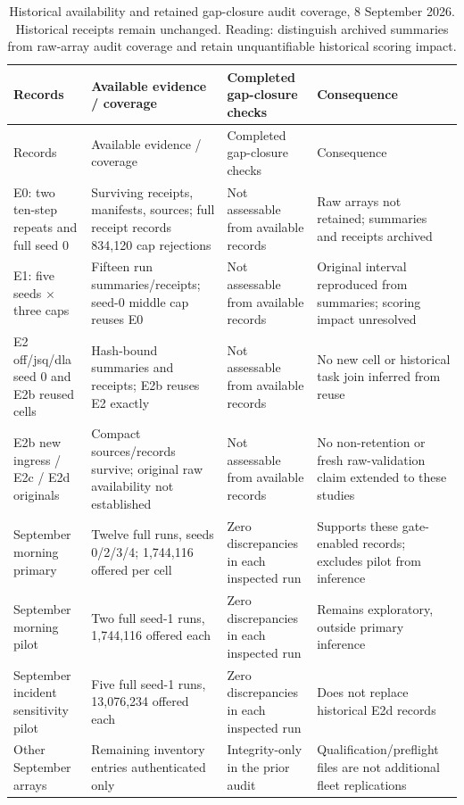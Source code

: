 \documentclass[12pt,a4paper]{article}
\begin{document}
\begingroup
\singlespacing\footnotesize\setlength{\tabcolsep}{3pt}
\renewcommand{\thetable}{B1}
\begin{xltabular}{\textwidth}{@{}YYYY@{}}
\caption[Historical audit coverage]{Historical availability and retained gap-closure audit coverage, 8 September 2026. Historical receipts remain unchanged. Reading: distinguish archived summaries from raw-array audit coverage and retain unquantifiable historical scoring impact.}\label{tab:B1} \\
\toprule
Records & Available evidence / coverage & Completed gap-closure checks & Consequence \\
\midrule\endfirsthead
\toprule
Records & Available evidence / coverage & Completed gap-closure checks & Consequence \\
\midrule\endhead
\bottomrule\endfoot
E0: two ten-step repeats and full seed 0 & Surviving receipts, manifests, sources; full receipt records 834,120 cap rejections & Not assessable from available records & Raw arrays not retained; summaries and receipts archived \\
E1: five seeds \ensuremath{\times} three caps & Fifteen run summaries/receipts; seed-0 middle cap reuses E0 & Not assessable from available records & Original interval reproduced from summaries; scoring impact unresolved \\
E2 off/jsq/dla seed 0 and E2b reused cells & Hash-bound summaries and receipts; E2b reuses E2 exactly & Not assessable from available records & No new cell or historical task join inferred from reuse \\
E2b new ingress / E2c / E2d originals & Compact sources/records survive; original raw availability not established & Not assessable from available records & No non-retention or fresh raw-validation claim extended to these studies \\
September morning primary & Twelve full runs, seeds 0/2/3/4; 1,744,116 offered per cell & Zero discrepancies in each inspected run & Supports these gate-enabled records; excludes pilot from inference \\
September morning pilot & Two full seed-1 runs, 1,744,116 offered each & Zero discrepancies in each inspected run & Remains exploratory, outside primary inference \\
September incident sensitivity pilot & Five full seed-1 runs, 13,076,234 offered each & Zero discrepancies in each inspected run & Does not replace historical E2d records \\
Other September arrays & Remaining inventory entries authenticated only & Integrity-only in the prior audit & Qualification/preflight files are not additional fleet replications \\
\end{xltabular}
\endgroup
\end{document}
